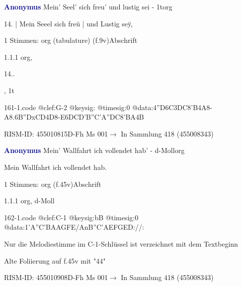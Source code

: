 \documentclass[twocolumn]{book}
\begin{document}
\par \vspace{7pt} \textcolor{darkblue}{\textbf{Anonymus  }}\hfillplus{\textbf{[161]}}\newline Mein' Seel' sich freu' und lustig sei - 1t\newline org
\par \begin{itshape}[f.9v, at left:] 14. | Mein Seeel sich freü | und Lustig seÿ,\end{itshape} 
\par \textcolor{darkblue}{}  1 Stimmen: org (tabulature)  (f.9v)\newline Abschrift
\par 1.1.1  org, \begin{itshape}14..\end{itshape}, 1t  
\begin{filecontents*}{161-1.code}
@clef:G-2
@keysig:
@timesig:0
@data:4''D{6C3DC8'B}4A8-A{8.6B''DxCD}4D8-E{6DCD'B}{''C'A''DC}{8'BA}4B
\end{filecontents*}
\newline
%
\par RISM-ID: 455010815\newline D-Fh  Ms 001\newline $\rightarrow$ In Sammlung 418 (455008343)
      
\par \vspace{7pt} \textcolor{darkblue}{\textbf{Anonymus  }}\hfillplus{\textbf{[162]}}\newline Mein' Wallfahrt ich vollendet hab' - d-Moll\newline org
\par \begin{itshape}[f.45v, at left:] Mein Wallfahrt ich vollendet hab.\end{itshape} 
\par \textcolor{darkblue}{}  1 Stimmen: org  (f.45v)\newline Abschrift
\par 1.1.1  org, d-Moll  
\begin{filecontents*}{162-1.code}
@clef:C-1
@keysig:bB
@timesig:0
@data:1'A''C'BAAGFE/AnB''C'AEFGED://:
\end{filecontents*}
\newline
%
\par Nur die Melodiestimme im C-1-Schlüssel ist verzeichnet mit dem Textbeginn
\par Alte Foliierung auf f.45v mit "44"
\par RISM-ID: 455010908\newline D-Fh  Ms 001\newline $\rightarrow$ In Sammlung 418 (455008343)
      
\end{document}
